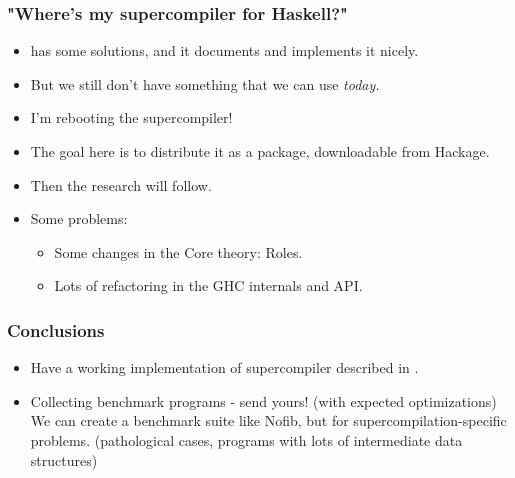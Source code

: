 \documentclass{beamer}
\begin{document}
\begin{frame}
    \frametitle{"Where's my supercompiler for Haskell?"}

    \begin{itemize}[<+->]
        \item
            \citet{callbyneed-sc} has some solutions, and it documents and
            implements it nicely.

        \item
            But we still don't have something that we can use \textit{today.}

        \item
            I'm rebooting the supercompiler!

        \item
            The goal here is to distribute it as a package, downloadable from
            Hackage.

        \item
            Then the research will follow.

        \item
            Some problems:
            \begin{itemize}
                \item
                    Some changes in the Core theory: Roles.
                \item
                    Lots of refactoring in the GHC internals and API.
            \end{itemize}
    \end{itemize}
\end{frame}

\begin{frame}
    \frametitle{Conclusions}

    \begin{itemize}[<+->]
        \item[]
            Have a working implementation of supercompiler described in
            \citet{callbyneed-sc}.
        \item[]
            Collecting benchmark programs - send yours! (with expected
            optimizations)
            \newline
            We can create a benchmark suite like Nofib, but for
            supercompilation-specific problems. (pathological cases, programs
            with lots of intermediate data structures)
    \end{itemize}
\end{frame}
\end{document}
